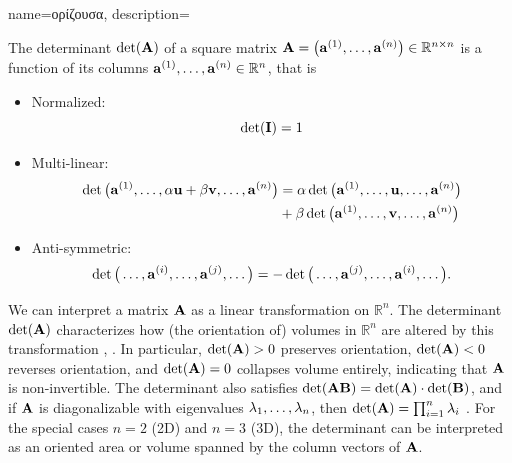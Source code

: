 {name={\foreignlanguage{greek}{ορίζουσα}},
	description={The determinant $\det({\bf A})$ of a square matrix 
		${\bf A} = \big( {\bf a}^{(1)},\ldots, {\bf a}^{(n)} \big) \in \mathbb{R}^{n \times n}$ is a 
		\gls{function} of its columns ${\bf a}^{(1)},\ldots,{\bf a}^{(n)} \in \mathbb{R}^{n}$, that is \cite{DirschmidHansJorg1996TuF}
		\begin{itemize}
			\item Normalized: $$\det (\mathbf{I}) = 1$$ 
			\item Multi-linear: \begin{align} \nonumber \det \big({\bf a}^{(1)},\ldots,\alpha{\bf u}+ \beta {\bf v},\ldots,{\bf a}^{(n)} \big) & = \alpha\det \big({\bf a}^{(1)},\ldots,{\bf u},\ldots,{\bf a}^{(n)} \big) \\ 
			& +\beta\det \big({\bf a}^{(1)},\ldots,{\bf v},\ldots,{\bf a}^{(n)} \big) \nonumber
			\end{align}
			\item Anti-symmetric: $$\det \big(\ldots,{\bf a}^{(i)}, \ldots, {\bf a}^{(j)},\ldots \big) = - \det \big(\ldots,{\bf a}^{(j)}, \ldots, {\bf a}^{(i)},\ldots \big).$$ 
		\end{itemize} 
		We can interpret a matrix ${\bf A}$ as a linear transformation on $\mathbb{R}^{n}$. 
		The determinant $\det({\bf A})$ characterizes how (the orientation of) 
 		volumes in $\mathbb{R}^n$ are altered by this transformation \cite{GolubVanLoanBook}, \cite{Strang2007}. 
 		In particular, $\det({\bf A}) > 0$ preserves orientation, $\det({\bf A}) < 0$ reverses orientation, 
 		and $\det({\bf A}) = 0$ collapses volume entirely, indicating that ${\bf A}$ is non-invertible. 
 		The determinant also satisfies $\det({\bf A} {\bf B}) = \det({\bf A}) \cdot \det({\bf B})$, and if ${\bf A}$ is 
 		diagonalizable with \glspl{eigenvalue} $\lambda_{1}, \ldots, \lambda_{n}$, then $\det({\bf A}) = \prod_{i=1}^{n} \lambda_{i}$ \cite{HornMatAnalysis}.
    		For the special cases $n=2$ (2D) and $n=3$ (3D), the determinant can be interpreted as an oriented 
    		area or volume spanned by the column vectors of ${\bf A}$.
    		\begin{figure}[H]
    			\begin{center}
\end{center}
\end{figure}}}
